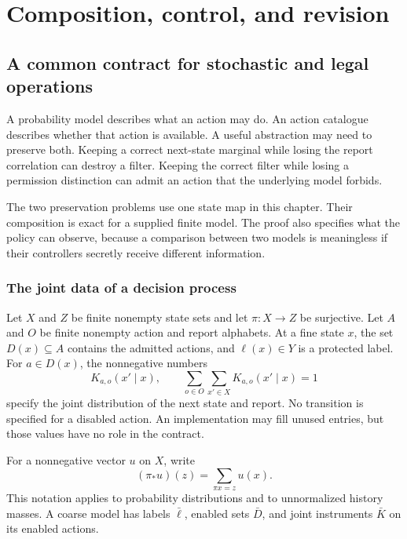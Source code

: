 \part{Composition, control, and revision}
\chapter{A common contract for stochastic and legal operations}\label{Core:book:chapter-10}
\setcounter{section}{0}\label{Core:ch:jointcontract}

A probability model describes what an action may do. An action catalogue describes whether that action is available. A useful abstraction may need to preserve both. Keeping a correct next-state marginal while losing the report correlation can destroy a filter. Keeping the correct filter while losing a permission distinction can admit an action that the underlying model forbids.

The two preservation problems use one state map in this chapter. Their composition is exact for a supplied finite model. The proof also specifies what the policy can observe, because a comparison between two models is meaningless if their controllers secretly receive different information.

\section{The joint data of a decision process}
Let $X$ and $Z$ be finite nonempty state sets and let $\pi:X\to Z$ be surjective. Let $A$ and $O$ be finite nonempty action and report alphabets. At a fine state $x$, the set $D(x)\subseteq A$ contains the admitted actions, and $\ell(x)\in Y$ is a protected label. For $a\in D(x)$, the nonnegative numbers
\[
 K_{a,o}(x'\mid x),\qquad
 \sum_{o\in O}\sum_{x'\in X}K_{a,o}(x'\mid x)=1
\]
specify the joint distribution of the next state and report. No transition is specified for a disabled action. An implementation may fill unused entries, but those values have no role in the contract.

For a nonnegative vector $u$ on $X$, write
\[
 (\pi_*u)(z)=\sum_{\pi x=z}u(x).
\]
This notation applies to probability distributions and to unnormalized history masses. A coarse model has labels $\bar\ell$, enabled sets $\bar D$, and joint instruments $\bar K$ on its enabled actions.

